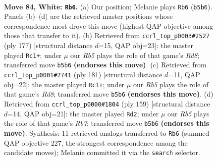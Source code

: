 \documentclass[11pt]{article}
\begin{document}
\clearpage

\begin{figure}[p]\centering
\begin{subfigure}{0.46\textwidth}\centering
\resizebox{\linewidth}{!}{%
\newchessgame
\chessboard[
  setfen={2k5/6n1/8/1R6/p6r/P6p/7K/8 w - - 26 84},
  showmover=false,
  pgfstyle=straightmove, color=movearrow, markmove={b5-b6}
]}
\caption{}
\end{subfigure}\hfill
\begin{subfigure}{0.46\textwidth}\centering
\resizebox{\linewidth}{!}{%
\newchessgame
\chessboard[
  setfen={8/k7/P7/R1P5/2K5/8/8/3r4 b - - 18 89},
  showmover=false,
  pgfstyle=straightmove, color=movearrow, markmove={d1-c1}
]}
\caption{}
\end{subfigure}
\\[4pt]
\begin{subfigure}{0.46\textwidth}\centering
\resizebox{\linewidth}{!}{%
\newchessgame
\chessboard[
  setfen={8/6k1/4R1P1/2K5/4P3/8/8/3r4 b - - 58 91},
  showmover=false,
  pgfstyle=straightmove, color=movearrow, markmove={d1-c1}
]}
\caption{}
\end{subfigure}\hfill
\begin{subfigure}{0.46\textwidth}\centering
\resizebox{\linewidth}{!}{%
\newchessgame
\chessboard[
  setfen={8/8/8/5R1P/7k/5P2/1r6/5K2 b - - 2 80},
  showmover=false,
  pgfstyle=straightmove, color=movearrow, markmove={b2-d2}
]}
\caption{}
\end{subfigure}
\caption{\textbf{Move 84, White: \texttt{Rb6}.} (a) Our position; Melanie plays \texttt{Rb6} (\texttt{b5b6}). Panels (b)--(d) are the retrieved master positions whose correspondence most drove this move (highest QAP objective among those that transfer to it). (b) Retrieved from \texttt{ccrl\_top\_p0003\#2527} (ply 177) [structural distance $d$=15, QAP obj=23]: the master played \texttt{Rc1+}; under $\mu$ our \emph{Rb5} plays the role of that game's \emph{Rd8}; transferred move \texttt{b5b6} \textbf{(endorses this move)}. (c) Retrieved from \texttt{ccrl\_top\_p0001\#2741} (ply 181) [structural distance $d$=11, QAP obj=22]: the master played \texttt{Rc1+}; under $\mu$ our \emph{Rb5} plays the role of that game's \emph{Rd8}; transferred move \texttt{b5b6} \textbf{(endorses this move)}. (d) Retrieved from \texttt{ccrl\_top\_p0000\#1804} (ply 159) [structural distance $d$=14, QAP obj=21]: the master played \texttt{Rd2}; under $\mu$ our \emph{Rb5} plays the role of that game's \emph{Rb7}; transferred move \texttt{b5b6} \textbf{(endorses this move)}. Synthesis: 11 retrieved analogs transferred to \texttt{Rb6} (summed QAP objective 227, the strongest correspondence among the candidate moves); Melanie committed it via the \texttt{search} selector.}
\label{fig:thought-m166}
\end{figure}
\end{document}
